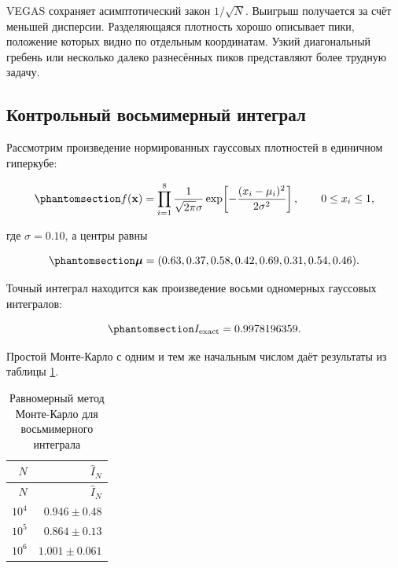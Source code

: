 \documentclass[
  russian,
  11pt,
  a4paper,
  open=any]{scrbook}
\begin{document}
VEGAS сохраняет асимптотический закон \(1/\sqrt N\). Выигрыш получается
за счёт меньшей дисперсии. Разделяющаяся плотность хорошо описывает
пики, положение которых видно по отдельным координатам. Узкий
диагональный гребень или несколько далеко разнесённых пиков представляют
более трудную задачу.

\subsection{Контрольный восьмимерный
интеграл}\label{ux43aux43eux43dux442ux440ux43eux43bux44cux43dux44bux439-ux432ux43eux441ux44cux43cux438ux43cux435ux440ux43dux44bux439-ux438ux43dux442ux435ux433ux440ux430ux43b}

Рассмотрим произведение нормированных гауссовых плотностей в единичном
гиперкубе:

\begin{equation}\protect\phantomsection\label{eq-ch8-vegas-test-integrand}{
f(\mathbf x)=
\prod_{i=1}^{8}
\frac{1}{\sqrt{2\pi}\sigma}
\exp\!\left[-\frac{(x_i-\mu_i)^2}{2\sigma^2}\right],
\qquad 0\leq x_i\leq1,
}\end{equation}

где \(\sigma=0.10\), а центры равны

\begin{equation}\protect\phantomsection\label{eq-ch8-vegas-test-centres}{
\boldsymbol\mu=
(0.63,0.37,0.58,0.42,0.69,0.31,0.54,0.46).
}\end{equation}

Точный интеграл находится как произведение восьми одномерных гауссовых
интегралов:

\begin{equation}\protect\phantomsection\label{eq-ch8-vegas-test-exact}{
I_{\mathrm{exact}}=0.9978196359.
}\end{equation}

Простой Монте-Карло с одним и тем же начальным числом даёт результаты из
таблицы \ref{tbl-ch8-plain-monte-carlo}.

\begin{longtable}[]{@{}rr@{}}
\caption{Равномерный метод Монте-Карло для восьмимерного
интеграла}\label{tbl-ch8-plain-monte-carlo}\tabularnewline
\toprule\noalign{}
\(N\) & \(\widehat I_N\) \\
\midrule\noalign{}
\endfirsthead
\toprule\noalign{}
\(N\) & \(\widehat I_N\) \\
\midrule\noalign{}
\endhead
\bottomrule\noalign{}
\endlastfoot
\(10^4\) & \(0.946\pm0.48\) \\
\(10^5\) & \(0.864\pm0.13\) \\
\(10^6\) & \(1.001\pm0.061\) \\
\end{longtable}
\end{document}
